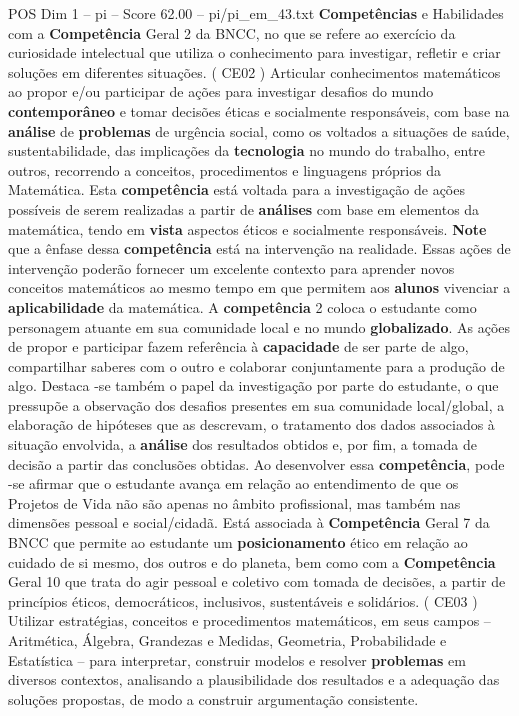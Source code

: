 \begin{textsample}{POS Dim 1 – pi – Score 62.00 – pi/pi\_em\_43.txt}  \label{ex:f1_pos_052}
\textbf{Competências} e Habilidades com a \textbf{Competência} Geral 2 da BNCC, no que se refere ao exercício da curiosidade intelectual que utiliza o conhecimento para investigar, refletir e criar soluções em diferentes situações. ( CE02 ) Articular conhecimentos matemáticos ao propor e/ou participar de ações para investigar desafios do mundo \textbf{contemporâneo} e tomar decisões éticas e socialmente responsáveis, com base na \textbf{análise} de \textbf{problemas} de urgência social, como os voltados a situações de saúde, sustentabilidade, das implicações da \textbf{tecnologia} no mundo do trabalho, entre outros, recorrendo a conceitos, procedimentos e linguagens próprios da Matemática.
Esta \textbf{competência} está voltada para a investigação de ações possíveis de serem realizadas a partir de \textbf{análises} com base em elementos da matemática, tendo em \textbf{vista} aspectos éticos e socialmente responsáveis. \textbf{Note} que a ênfase dessa \textbf{competência} está na intervenção na realidade.
Essas ações de intervenção poderão fornecer um excelente contexto para aprender novos conceitos matemáticos ao mesmo tempo em que permitem aos \textbf{alunos} vivenciar a \textbf{aplicabilidade} da matemática.
A \textbf{competência} 2 coloca o estudante como personagem atuante em sua comunidade local e no mundo \textbf{globalizado}.
As ações de propor e participar fazem referência à \textbf{capacidade} de ser parte de algo, compartilhar saberes com o outro e colaborar conjuntamente para a produção de algo.
Destaca -se também o papel da investigação por parte do estudante, o que pressupõe a observação dos desafios presentes em sua comunidade local/global, a elaboração de hipóteses que as descrevam, o tratamento dos dados associados à situação envolvida, a \textbf{análise} dos resultados obtidos e, por fim, a tomada de decisão a partir das conclusões obtidas.
Ao desenvolver essa \textbf{competência}, pode -se afirmar que o estudante avança em relação ao entendimento de que os Projetos de Vida não são apenas no âmbito profissional, mas também nas dimensões pessoal e social/cidadã.
Está associada à \textbf{Competência} Geral 7 da BNCC que permite ao estudante um \textbf{posicionamento} ético em relação ao cuidado de si mesmo, dos outros e do planeta, bem como com a \textbf{Competência} Geral 10 que trata do agir pessoal e coletivo com tomada de decisões, a partir de princípios éticos, democráticos, inclusivos, sustentáveis e solidários. ( CE03 ) Utilizar estratégias, conceitos e procedimentos matemáticos, em seus campos – Aritmética, Álgebra, Grandezas e Medidas, Geometria, Probabilidade e Estatística – para interpretar, construir modelos e resolver \textbf{problemas} em diversos contextos, analisando a plausibilidade dos resultados e a adequação das soluções propostas, de modo a construir argumentação consistente.

\end{textsample}
